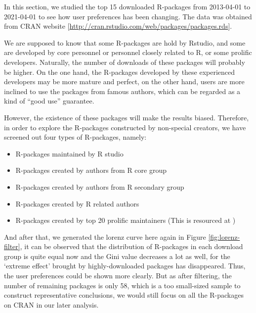 \documentclass[
]{book}
\providecommand{\tightlist}{%
  \setlength{\itemsep}{0pt}\setlength{\parskip}{0pt}}
\begin{document}
In this section, we studied the top 15 downloaded R-packages from 2013-04-01 to 2021-04-01 to see how user preferences has been changing. The data was obtained from CRAN website {[}\url{http://cran.rstudio.com/web/packages/packages.rds}{]}.

We are supposed to know that some R-packages are hold by Rstudio, and some are developed by core personnel or personnel closely related to R, or some prolific developers. Naturally, the number of downloads of these packages will probably be higher. On the one hand, the R-packages developed by these experienced developers may be more mature and perfect, on the other hand, users are more inclined to use the packages from famous authors, which can be regarded as a kind of ``good use'' guarantee.

However, the existence of these packages will make the results biased. Therefore, in order to explore the R-packages constructed by non-special creators, we have screened out four types of R-packages, namely:

\begin{itemize}
\tightlist
\item
  R-packages maintained by R studio
\item
  R-packages created by authors from R core group
\item
  R-packages created by authors from R secondary group
\item
  R-packages created by R related authors
\item
  R-packages created by top 20 prolific maintainers (This is resourced at \textcite{revolutions})
\end{itemize}

And after that, we generated the lorenz curve here again in Figure \ref{fig:lorenz-filter}, it can be observed that the distribution of R-packages in each download group is quite equal now and the Gini value decreases a lot as well, for the `extreme effect' brought by highly-downloaded packages has disappeared. Thus, the user preferences could be shown more clearly. But as after filtering, the number of remaining packages is only 58, which is a too small-sized sample to construct representative conclusions, we would still focus on all the R-packages on CRAN in our later analysis.
\end{document}
